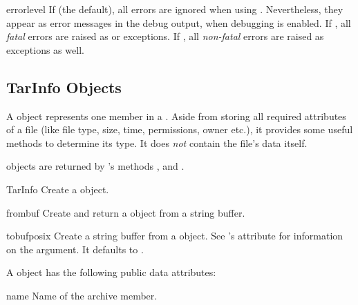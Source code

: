 \begin{memberdesc}{errorlevel}
    If  (the default), all errors are ignored when using
    .  Nevertheless, they appear as error messages
    in the debug output, when debugging is enabled.  If , all
    \emph{fatal} errors are raised as  or
     exceptions.  If , all \emph{non-fatal}
    errors are raised as  exceptions as well.
\end{memberdesc}


\subsection{TarInfo Objects \label{tarinfo-objects}}

A  object represents one member in a
. Aside from storing all required attributes of a file
(like file type, size, time, permissions, owner etc.), it provides
some useful methods to determine its type. It does \emph{not} contain
the file's data itself.

 objects are returned by 's methods
,  and .

\begin{classdesc}{TarInfo}{}
    Create a  object.
\end{classdesc}

\begin{methoddesc}{frombuf}{}
    Create and return a  object from a string buffer.
\end{methoddesc}

\begin{methoddesc}{tobuf}{posix}
    Create a string buffer from a  object.
    See 's  attribute for information
    on the  argument. It defaults to .

\end{methoddesc}

A  object has the following public data attributes:

\begin{memberdesc}{name}
    Name of the archive member.
\end{memberdesc}

